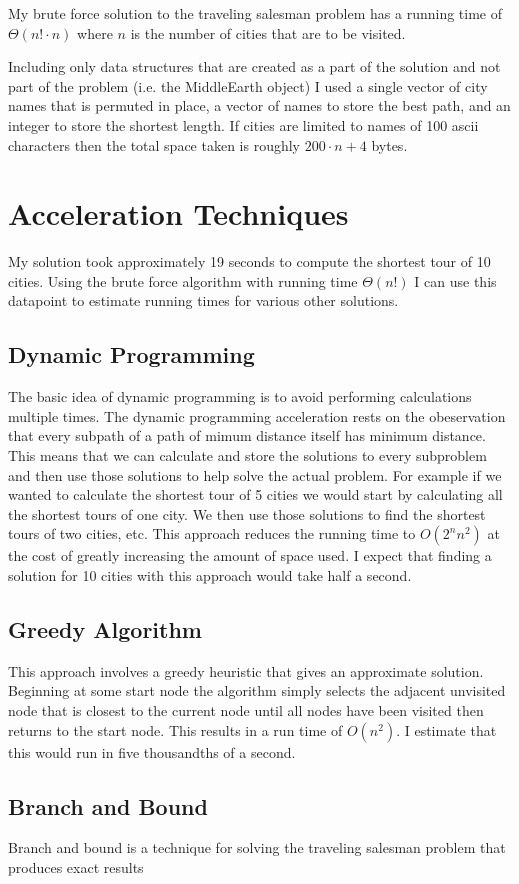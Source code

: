 \documentclass{article}
\begin{document}
My brute force solution to the traveling salesman problem has a running time of $\Theta(n!\cdot n)$ where $n$ is the number of cities that are to be visited. 

Including only data structures that are created as a part of the solution and not part of the problem (i.e. the MiddleEarth object) I used a single vector of city names that is permuted in place, a vector of names to store the best path, and an integer to store the shortest length. If cities are limited to names of 100 ascii characters then the total space taken is roughly $200\cdot n + 4$ bytes. 

\section{Acceleration Techniques}
My solution took approximately 19 seconds to compute the shortest tour of 10 cities. Using the brute force algorithm with running time $\Theta(n!)$ I can use this datapoint to estimate running times for various other solutions.

\subsection{Dynamic Programming}
The basic idea of dynamic programming is to avoid performing calculations multiple times.
The dynamic programming acceleration rests on the obeservation that every subpath of a path of mimum distance itself has minimum distance. This means that we can calculate and store the solutions to every subproblem and then use those solutions to help solve the actual problem. For example if we wanted to calculate the shortest tour of 5 cities we would start by calculating all the shortest tours of one city. We then use those solutions to find the shortest tours of two cities, etc. This approach reduces the running time to $O(2^nn^2)$ at the cost of greatly increasing the amount of space used. I expect that finding a solution for 10 cities with this approach would take half a second.

\subsection{Greedy Algorithm}
This approach involves a greedy heuristic that gives an approximate solution. Beginning at some start node the algorithm simply selects the adjacent unvisited node that is closest to the current node until all nodes have been visited then returns to the start node. This results in a run time of $O(n^2)$. I estimate that this would run in five thousandths of a second.

\subsection{Branch and Bound}
Branch and bound is a technique for solving the traveling salesman problem that produces exact results 
\end{document}
